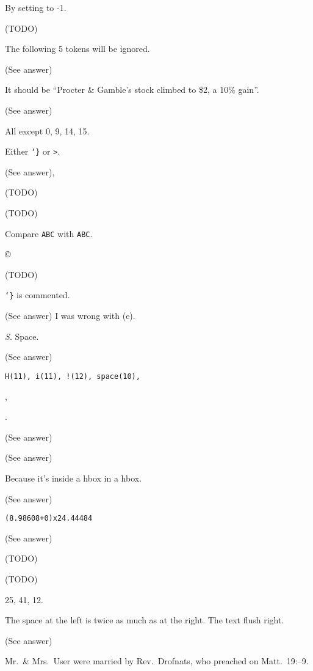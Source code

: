  By setting {\tt \string\hbadness} to -1.

 (TODO)

 The following 5 tokens will be ignored.

 (See answer)

 It should be ``Procter \& Gamble's stock climbed to \$2, a 10\% gain''.

 (See answer)

 All except 0, 9, 14, 15.

 Either {\tt \char`\}} or {\tt >}.

 (See answer), {\tt \string\hi}

 (TODO)

 (TODO)

 Compare {\tt \uppercase{a\lowercase{bC}}} with {\tt ABC}.

 \copyright\ \uppercase\expandafter{\romannumeral\year}

 (TODO)

 {\tt \char`\}} is commented.

 (See answer) I was wrong with (e).

 {\sl S}. Space.

 (See answer)

 {\tt H(11), i(11), !(12), space(10), \string\par, \string\par}.

 (See answer)

 (See answer)

 Because it's inside a hbox in a hbox.

 (See answer)

 {\tt \string\hbox(8.98608+0)x24.44484}

 (See answer)

 (TODO)

 (TODO)

 25, 41, 12.

 The space at the left is twice as much as at the right. The text flush right.

 (See answer)

 Mr.~\& Mrs.~User were married by Rev.~Drofnats, who preached on Matt.~19\thinspace:--9.

